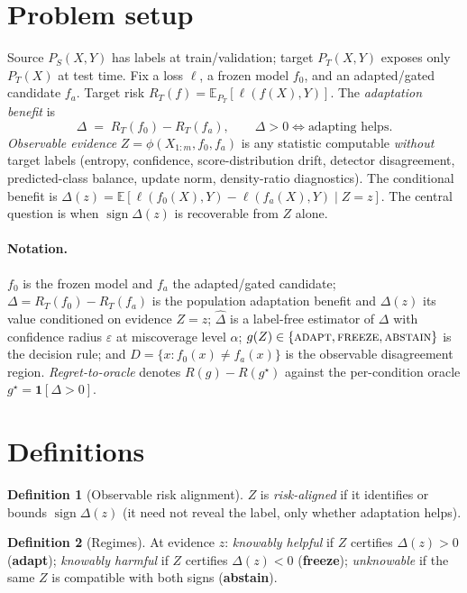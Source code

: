 \documentclass[conference]{IEEEtran}
\theoremstyle{plain}
\theoremstyle{definition}
\newtheorem{definition}{Definition}
\newcommand{\E}{\mathbb{E}}
\newcommand{\sign}{\operatorname{sign}}
\begin{document}
\section{Problem setup}\label{sec:setup}
Source $P_S(X,Y)$ has labels at train/validation; target $P_T(X,Y)$ exposes only
$P_T(X)$ at test time. Fix a loss $\ell$, a frozen model $f_0$, and an
adapted/gated candidate $f_a$. Target risk $R_T(f)=\E_{P_T}[\ell(f(X),Y)]$.
The \emph{adaptation benefit} is
\begin{equation}
\Delta \;=\; R_T(f_0)-R_T(f_a),\qquad \Delta>0 \iff \text{adapting helps.}
\end{equation}
\emph{Observable evidence} $Z=\phi(X_{1:m},f_0,f_a)$ is any statistic computable
\emph{without} target labels (entropy, confidence, score-distribution drift,
detector disagreement, predicted-class balance, update norm, density-ratio
diagnostics). The conditional benefit is $\Delta(z)=\E[\ell(f_0(X),Y)-\ell(f_a(X),Y)\mid Z=z]$.
The central question is when $\sign\Delta(z)$ is recoverable from $Z$ alone.

\paragraph{Notation.} $f_0$ is the frozen model and $f_a$ the adapted/gated candidate;
$\Delta=R_T(f_0)-R_T(f_a)$ is the population adaptation benefit and $\Delta(z)$ its value
conditioned on evidence $Z{=}z$; $\widehat\Delta$ is a label-free estimator of $\Delta$ with
confidence radius $\varepsilon$ at miscoverage level $\alpha$; $g(Z)\in\{\textsc{adapt},
\textsc{freeze},\textsc{abstain}\}$ is the decision rule; and $D=\{x:f_0(x)\neq f_a(x)\}$ is the
observable disagreement region. \emph{Regret-to-oracle} denotes $R(g)-R(g^\star)$ against the
per-condition oracle $g^\star=\mathbf1[\Delta>0]$.

\section{Definitions}\label{sec:def}
\begin{definition}[Observable risk alignment]
$Z$ is \emph{risk-aligned} if it identifies or bounds $\sign\Delta(z)$ (it need not
reveal the label, only whether adaptation helps).
\end{definition}
\begin{definition}[Regimes]
At evidence $z$: \emph{knowably helpful} if $Z$ certifies $\Delta(z)>0$ (\textbf{adapt});
\emph{knowably harmful} if $Z$ certifies $\Delta(z)<0$ (\textbf{freeze});
\emph{unknowable} if the same $Z$ is compatible with both signs (\textbf{abstain}).
\end{definition}
\end{document}
